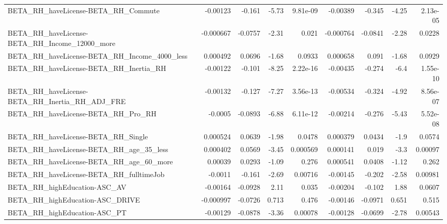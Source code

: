 \begin{tabular}{lrrrrrrrr}
BETA\_RH\_haveLicense-BETA\_RH\_Commute                &    -0.00123 &       -0.161 &    -5.73 & 9.81e-09 &   -0.00389 &      -0.345 &        -4.25 &      2.13e-05 \\
BETA\_RH\_haveLicense-BETA\_RH\_Income\_12000\_more      &   -0.000667 &      -0.0757 &    -2.31 &    0.021 &  -0.000764 &     -0.0841 &        -2.28 &        0.0228 \\
BETA\_RH\_haveLicense-BETA\_RH\_Income\_4000\_less       &    0.000492 &       0.0696 &    -1.68 &   0.0933 &   0.000658 &       0.091 &        -1.68 &        0.0929 \\
BETA\_RH\_haveLicense-BETA\_RH\_Inertia\_RH             &    -0.00122 &       -0.101 &    -8.25 & 2.22e-16 &   -0.00435 &      -0.274 &         -6.4 &      1.55e-10 \\
BETA\_RH\_haveLicense-BETA\_RH\_Inertia\_RH\_ADJ\_FRE     &    -0.00132 &       -0.127 &    -7.27 & 3.56e-13 &   -0.00534 &      -0.324 &        -4.92 &      8.56e-07 \\
BETA\_RH\_haveLicense-BETA\_RH\_Pro\_RH                 &     -0.0005 &      -0.0893 &    -6.88 & 6.11e-12 &   -0.00214 &      -0.276 &        -5.43 &      5.52e-08 \\
BETA\_RH\_haveLicense-BETA\_RH\_Single                 &    0.000524 &       0.0639 &    -1.98 &   0.0478 &   0.000379 &      0.0434 &         -1.9 &        0.0574 \\
BETA\_RH\_haveLicense-BETA\_RH\_age\_35\_less            &    0.000402 &       0.0569 &    -3.45 & 0.000569 &   0.000141 &       0.019 &         -3.3 &       0.00097 \\
BETA\_RH\_haveLicense-BETA\_RH\_age\_60\_more            &     0.00039 &       0.0293 &    -1.09 &    0.276 &   0.000541 &      0.0408 &        -1.12 &         0.262 \\
BETA\_RH\_haveLicense-BETA\_RH\_fulltimeJob            &     -0.0011 &       -0.161 &    -2.69 &  0.00716 &   -0.00145 &      -0.202 &        -2.58 &       0.00981 \\
BETA\_RH\_highEducation-ASC\_AV                       &    -0.00164 &      -0.0928 &     2.11 &    0.035 &   -0.00204 &      -0.102 &         1.88 &        0.0607 \\
BETA\_RH\_highEducation-ASC\_DRIVE                    &   -0.000997 &      -0.0726 &    0.713 &    0.476 &   -0.00146 &     -0.0971 &        0.651 &         0.515 \\
BETA\_RH\_highEducation-ASC\_PT                       &    -0.00129 &      -0.0878 &    -3.36 &  0.00078 &   -0.00128 &     -0.0699 &        -2.78 &       0.00543 \\

\end{tabular}
